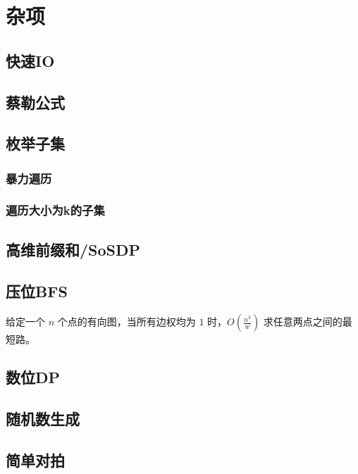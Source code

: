 \documentclass{article}
\begin{document}
\section{杂项}
\subsection{快速IO}

\subsection{蔡勒公式}

\subsection{枚举子集}
\subsubsection{暴力遍历}

\subsubsection{遍历大小为k的子集}

\subsection{高维前缀和/SoSDP}

\subsection{压位BFS}
给定一个 $n$ 个点的有向图，当所有边权均为 $1$ 时，$O(\frac{n^3}{w})$ 求任意两点之间的最短路。

\subsection{数位DP}

\subsection{随机数生成}

\subsection{简单对拍}

\end{document}
